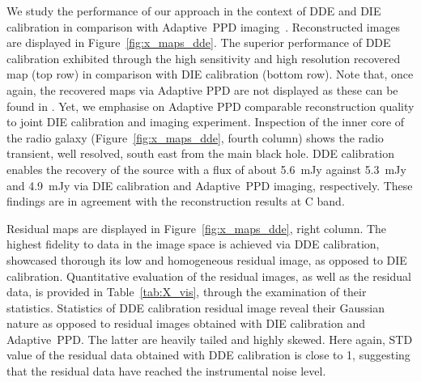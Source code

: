 \documentclass[fleqn,usenatbib]{mnras}
\begin{document}
We study the performance of our approach in the context of DDE and DIE calibration in comparison with {Adaptive~PPD} imaging~\citep{Dabbech2018}. Reconstructed images are displayed in Figure~\ref{fig:x_maps_dde}.
The superior performance of DDE calibration exhibited through the high sensitivity and high resolution recovered map (top row) in comparison with DIE calibration (bottom row). Note that, once again, the recovered maps via Adaptive PPD are not displayed as these can be found in \citet{Dabbech2018}. Yet, we emphasise on Adaptive PPD comparable reconstruction quality to joint DIE calibration and imaging experiment. Inspection of the inner core of the radio galaxy (Figure~\ref{fig:x_maps_dde}, fourth column) shows the radio transient, well resolved, south east from the main black hole. DDE calibration {{enables the recovery of}} the source with a flux of about 5.6~mJy against 5.3~mJy and 4.9~mJy via DIE calibration and {Adaptive~PPD} imaging, respectively. These findings are in agreement with the reconstruction results at C band. 

Residual maps are displayed in Figure~\ref{fig:x_maps_dde}, right column. The highest fidelity to data in the image space is achieved via DDE calibration, showcased thorough its low and homogeneous residual image, as opposed to DIE calibration. Quantitative evaluation of the residual images, as well as the residual data, is provided in Table~\ref{tab:X_vis}, through the examination of their statistics. 
Statistics of DDE calibration residual image reveal their Gaussian nature as opposed to residual images obtained with DIE calibration and {Adaptive~PPD}. The latter are heavily tailed and highly skewed. Here again, STD value of the residual data obtained with DDE calibration is close to 1, suggesting that the residual data have reached the instrumental noise level. 
%

%

\end{document}
